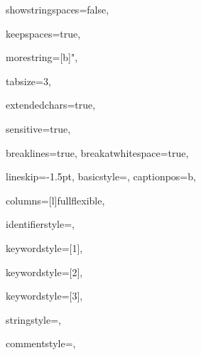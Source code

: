 {%
showstringspaces=false,

keepspaces=true,

morestring=[b]{"},

tabsize=3,

extendedchars=true,

sensitive=true,

breaklines=true,
breakatwhitespace=true,

lineskip={-1.5pt},
basicstyle={\ttfamily},
captionpos=b,

columns=[l]fullflexible,


identifierstyle={\ttfamily\color{black}},

keywordstyle=[1]{\ttfamily\color{keywordcolor}},

keywordstyle=[2]{\ttfamily\color{sortcolor}},

keywordstyle=[3]{\ttfamily\color{errorcolor}},



stringstyle={\ttfamily\color{stringcolor}},

commentstyle={\ttfamily\itshape\color{commentcolor}},

}
